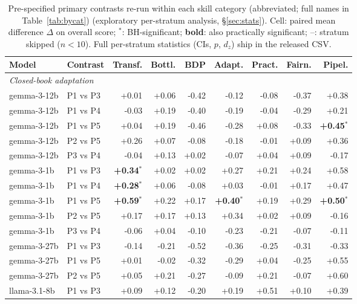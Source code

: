 \begin{table}[p]\centering\scriptsize
\caption{Pre-specified primary contrasts re-run within each skill category (abbreviated; full names in Table~\ref{tab:bycat}) (exploratory per-stratum analysis, \S\ref{sec:stats}). Cell: paired mean difference $\Delta$ on overall score; $^{*}$: BH-significant; \textbf{bold}: also practically significant; --: stratum skipped ($n<10$). Full per-stratum statistics (CIs, $p$, $d_z$) ship in the released CSV.}
\label{tab:stratcat}
\begin{tabular}{llrrrrrrr}
\toprule
Model & Contrast & Transf. & Bottl. & BDP & Adapt. & Pract. & Fairn. & Pipel. \\
\midrule \multicolumn{9}{l}{\textit{Closed-book adaptation}} \\ \midrule
gemma-3-12b & P1 vs P3 & +0.01 & +0.06 & -0.42 & -0.12 & -0.08 & -0.37 & +0.38 \\
gemma-3-12b & P1 vs P4 & -0.03 & +0.19 & -0.40 & -0.19 & -0.04 & -0.29 & +0.21 \\
gemma-3-12b & P1 vs P5 & +0.04 & +0.19 & -0.46 & -0.28 & +0.08 & -0.33 & \textbf{+0.45$^{*}$} \\
gemma-3-12b & P2 vs P5 & +0.26 & +0.07 & -0.08 & -0.18 & -0.01 & +0.09 & +0.36 \\
gemma-3-12b & P3 vs P4 & -0.04 & +0.13 & +0.02 & -0.07 & +0.04 & +0.09 & -0.17 \\
gemma-3-1b & P1 vs P3 & \textbf{+0.34$^{*}$} & +0.02 & +0.02 & +0.27 & +0.21 & +0.24 & +0.58 \\
gemma-3-1b & P1 vs P4 & \textbf{+0.28$^{*}$} & +0.06 & -0.08 & +0.03 & -0.01 & +0.17 & +0.47 \\
gemma-3-1b & P1 vs P5 & \textbf{+0.59$^{*}$} & +0.22 & +0.17 & \textbf{+0.40$^{*}$} & +0.19 & +0.29 & \textbf{+0.50$^{*}$} \\
gemma-3-1b & P2 vs P5 & +0.17 & +0.17 & +0.13 & +0.34 & +0.02 & +0.09 & -0.16 \\
gemma-3-1b & P3 vs P4 & -0.06 & +0.04 & -0.10 & -0.23 & -0.21 & -0.07 & -0.11 \\
gemma-3-27b & P1 vs P3 & -0.14 & -0.21 & -0.52 & -0.36 & -0.25 & -0.31 & -0.33 \\
gemma-3-27b & P1 vs P5 & +0.01 & -0.02 & -0.32 & -0.29 & +0.04 & -0.25 & +0.55 \\
gemma-3-27b & P2 vs P5 & +0.05 & +0.21 & -0.27 & -0.09 & +0.21 & -0.07 & +0.60 \\
llama-3.1-8b & P1 vs P3 & +0.09 & +0.12 & -0.20 & +0.19 & +0.51 & +0.10 & +0.39 \\

\end{tabular}
\end{table}

